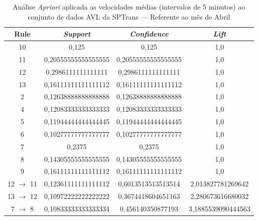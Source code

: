 \documentclass[
	12pt,				%
	oneside,			%
	a4paper,			%
	english,			%
	brazil				%
	]{abntex2ppgsi}
\begin{document}
{{\begin{apendicesenv}
\begin{table}[!htb]
\centering
\caption {Análise \textit{Apriori} aplicada as velocidades médias (intervalos de 5 minutos) ao conjunto de dados AVL da SPTrans --- Referente ao mês de Abril}
\label {tab:aprioriApril}
\begin{tabular}{c|c|c|c}
\hline
\textbf{Rule} & \textit{\textbf{Support}} & \textit{\textbf{Confidence}} & \textit{\textbf{Lift}} \\
\hline 
10 &  0,125 &  0,125 &  1,0\\
\hline
11 &  0,20555555555555555 &  0,20555555555555555 &  1,0\\
\hline
12 &  0,2986111111111111 &  0,2986111111111111 &  1,0\\
\hline
13 &  0,16111111111111112 &  0,16111111111111112 &  1,0\\
\hline
2 &  0,12638888888888888 &  0,12638888888888888 &  1,0\\
\hline
4 &  0,12083333333333333 &  0,12083333333333333 &  1,0\\
\hline
5 &  0,11944444444444445 &  0,11944444444444445 &  1,0\\
\hline
6 &  0,10277777777777777 &  0,10277777777777777 &  1,0\\
\hline
7 &  0,2375 &  0,2375 &  1,0\\
\hline
8 &  0,14305555555555555 &  0,14305555555555555 &  1,0\\
\hline
9 &  0,16111111111111112 &  0,16111111111111112 &  1,0\\
\hline
12  $\rightarrow$ 11 &  0,12361111111111112 &  0,6013513513513514 &  2,013827781269642\\
\hline
13  $\rightarrow$ 12 &  0,10972222222222222 &  0,3674418604651163 &  2,280673616680032\\
\hline
7  $\rightarrow$ 8 &  0,10833333333333334 &  0,456140350877193 &  3,1885539090444563\\
\hline
\end{tabular}
\end{table}


\end{apendicesenv}}}
\end{document}
